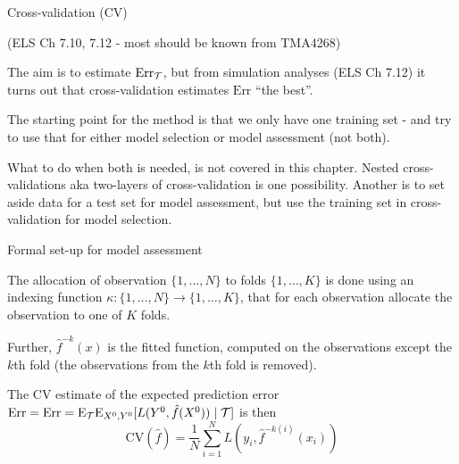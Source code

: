 \documentclass[
  ignorenonframetext,
]{beamer}
\begin{document}
\begin{frame}

\begin{block}{Cross-validation (CV)}

(ELS Ch 7.10, 7.12 - most should be known from TMA4268)

The aim is to estimate \(\text{Err}_{\cal T}\), but from simulation
analyses (ELS Ch 7.12) it turns out that cross-validation estimates
\(\text{Err}\) ``the best''.

The starting point for the method is that we only have one training set
- and try to use that for either model selection or model assessment
(not both).

What to do when both is needed, is not covered in this chapter. Nested
cross-validations aka two-layers of cross-validation is one possibility.
Another is to set aside data for a test set for model assessment, but
use the training set in cross-validation for model selection.

\end{block}

\end{frame}

\begin{frame}

\begin{block}{Formal set-up for model assessment}

The allocation of observation \(\{1,\ldots,N\}\) to folds
\(\{1,\ldots,K\}\) is done using an indexing function
\(\kappa: \{1,\ldots,N\} \rightarrow \{1,\ldots,K\}\), that for each
observation allocate the observation to one of \(K\) folds.

Further, \(\hat{f}^{-k}(x)\) is the fitted function, computed on the
observations except the \(k\)th fold (the observations from the \(k\)th
fold is removed).

The CV estimate of the expected prediction error
\(\text{Err}=\text{Err}=\text{E}_{\cal T} \text{E}_{X^0,Y^0}[L(Y^0,\hat{f}(X^0))\mid {\cal T}]\)
is then
\[ \text{CV}(\hat{f})=\frac{1}{N}\sum_{i=1}^N L(y_i,\hat{f}^{-k(i)}(x_i))\]

\end{block}

\end{frame}
\end{document}
